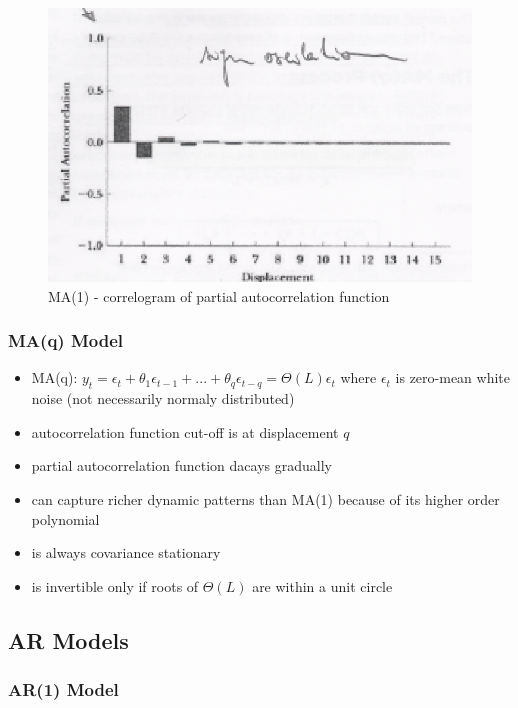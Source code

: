 \begin{figure}[htp]
\centering
\includegraphics[scale = 0.75]{MA2.eps}
\caption{MA(1) - correlogram of partial autocorrelation function}
\label{MA2}
\end{figure}

\subsubsection{MA(q) Model}

\begin{itemize}
\item MA(q): $y_t = \epsilon_t + \theta_1 \epsilon_{t-1} + ... + \theta_q \epsilon_{t - q} = \Theta(L)\epsilon_t$ where $\epsilon_t$ is zero-mean white noise (not necessarily normaly distributed)
\item autocorrelation function cut-off is at displacement $q$
\item partial autocorrelation function dacays gradually
\item can capture richer dynamic patterns than MA(1) because of its higher order polynomial
\item is always covariance stationary
\item is invertible only if roots of $\Theta(L)$ are within a unit circle
\end{itemize}

\subsection{AR Models}

\subsubsection{AR(1) Model}

